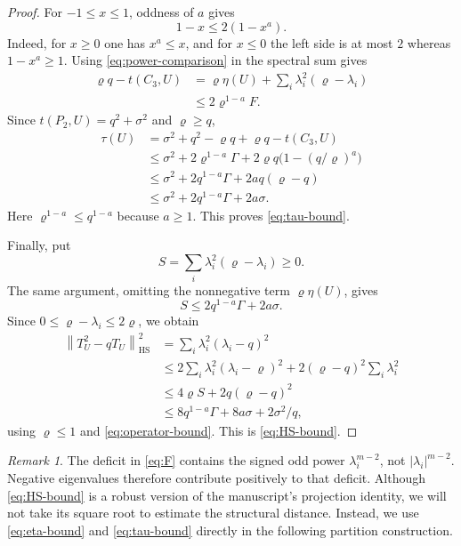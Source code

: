 \documentclass[11pt]{article}
\theoremstyle{remark}
\newtheorem{remark}[lemma]{Remark}
\newcommand{\HS}{\mathrm{HS}}
\newcommand{\norm}[1]{\left\lVert #1\right\rVert}
\begin{document}
\begin{proof}
For $-1\leq x\leq1$, oddness of $a$ gives
\begin{equation}\label{eq:power-comparison}
 1-x\leq2(1-x^a).
\end{equation}
Indeed, for $x\geq0$ one has $x^a\leq x$, and for $x\leq0$
the left side is at most $2$ whereas $1-x^a\geq1$.
Using \eqref{eq:power-comparison} in the spectral sum gives
\begin{align*}
 \varrho q-t(C_3,U)
 &=\varrho\eta(U)+\sum_i\lambda_i^2(\varrho-\lambda_i)\\
 &\leq2\varrho^{1-a}F.
\end{align*}
Since $t(P_2,U)=q^2+\sigma^2$ and $\varrho\geq q$,
\begin{align*}
 \tau(U)
 &=\sigma^2+q^2-\varrho q+\varrho q-t(C_3,U)\\
 &\leq\sigma^2+2\varrho^{1-a}\Gamma
       +2\varrho q\bigl(1-(q/\varrho)^a\bigr)\\
 &\leq\sigma^2+2q^{1-a}\Gamma+2a q(\varrho-q)\\
 &\leq\sigma^2+2q^{1-a}\Gamma+2a\sigma.
\end{align*}
Here $\varrho^{1-a}\leq q^{1-a}$ because $a\geq1$.
This proves \eqref{eq:tau-bound}.

Finally, put
\[
 S=\sum_i\lambda_i^2(\varrho-\lambda_i)\geq0.
\]
The same argument, omitting the nonnegative term
$\varrho\eta(U)$, gives
\[
 S\leq2q^{1-a}\Gamma+2a\sigma.
\]
Since $0\leq\varrho-\lambda_i\leq2\varrho$, we obtain
\begin{align*}
 \norm{T_U^2-qT_U}_{\HS}^2
 &=\sum_i\lambda_i^2(\lambda_i-q)^2\\
 &\leq2\sum_i\lambda_i^2(\lambda_i-\varrho)^2
       +2(\varrho-q)^2\sum_i\lambda_i^2\\
 &\leq4\varrho S+2q(\varrho-q)^2\\
 &\leq8q^{1-a}\Gamma+8a\sigma+2\sigma^2/q,
\end{align*}
using $\varrho\leq1$ and \eqref{eq:operator-bound}.
This is \eqref{eq:HS-bound}.
\end{proof}

\begin{remark}
The deficit in \eqref{eq:F} contains the signed odd power
$\lambda_i^{m-2}$, not $|\lambda_i|^{m-2}$.
Negative eigenvalues therefore contribute positively to that deficit.
Although \eqref{eq:HS-bound} is a robust version of the manuscript's
projection identity, we will not take its square root to estimate the
structural distance. Instead, we use \eqref{eq:eta-bound} and
\eqref{eq:tau-bound} directly in the following partition construction.
\end{remark}
\end{document}
